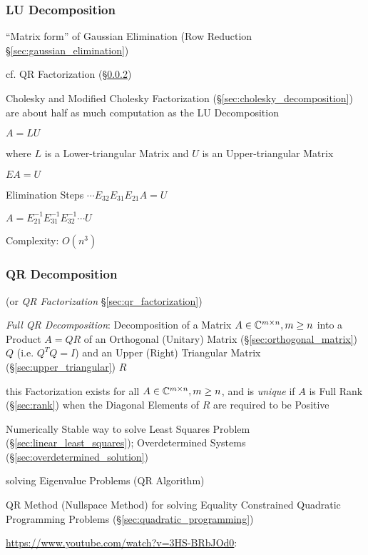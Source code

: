 \subsubsection{LU Decomposition}\label{sec:lu_decomposition}

``Matrix form'' of Gaussian Elimination (Row Reduction
\S\ref{sec:gaussian_elimination})

cf. QR Factorization (\S\ref{sec:qr_decomposition})

Cholesky and Modified Cholesky Factorization
(\S\ref{sec:cholesky_decomposition}) are about half as much computation as the
LU Decomposition

$A = LU$

where $L$ is a Lower-triangular Matrix and $U$ is an Upper-triangular Matrix

$EA = U$

Elimination Steps $\cdots E_{32}E_{31}E_{21}A = U$

$A = E_{21}^{-1}E_{31}^{-1}E_{32}^{-1}\cdots U$

Complexity: $O(n^3)$



\subsubsection{QR Decomposition}\label{sec:qr_decomposition}

(or \emph{QR Factorization} \S\ref{sec:qr_factorization})

\emph{Full QR Decomposition}: Decomposition of a Matrix $A \in \mathbb{C}^{m \times
  n}, m \geq n$ into a Product $A = QR$ of an Orthogonal (Unitary) Matrix
(\S\ref{sec:orthogonal_matrix}) $Q$ (i.e. $Q^TQ = I$) and an Upper (Right)
Triangular Matrix (\S\ref{sec:upper_triangular}) $R$

this Factorization exists for all $A \in \mathbb{C}^{m \times n}, m \geq n$, and is
\emph{unique} if $A$ is Full Rank (\S\ref{sec:rank}) when the Diagonal Elements
of $R$ are required to be Positive

Numerically Stable way to solve Least Squares Problem
(\S\ref{sec:linear_least_squares}); Overdetermined Systems
(\S\ref{sec:overdetermined_solution})

solving Eigenvalue Problems (QR Algorithm)

\fist QR Method (Nullspace Method) for solving Equality Constrained Quadratic
Programming Problems (\S\ref{sec:quadratic_programming})


\url{https://www.youtube.com/watch?v=3HS-BRbJOd0}:

